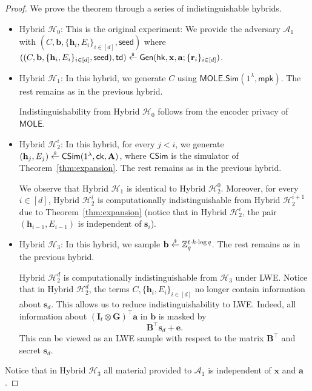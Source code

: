 \documentclass{article}
\newcommand{\td}{\mathsf{td}}
\newcommand{\MOLE}{\mathsf{MOLE}}
\newcommand{\getsr}{\overset{\raisebox{-1pt}{$\scriptscriptstyle \$$}}{\gets}}
\newcommand{\sample}{\getsr}
\newcommand{\Z}{\mathbb{Z}}
\renewcommand{\sec}{\ensuremath{\lambda}}
\newcommand{\Sim}{\mathsf{Sim}}
\newcommand{\Adv}{\mathcal{A}}
\newcommand{\ck}{\mathsf{ck}}
\newcommand{\algofont}[1]{\ensuremath{\mathsf{#1}}}
\newcommand{\Gen}{{\algofont{Gen}}}
\newcommand{\id}{\ensuremath{\mathbf{I}}}
\newcommand{\mpk}{\mathsf{mpk}}
\newcommand{\hk}{\ensuremath{\mathsf{hk}}}
\newcommand{\thmref}[1]{Theorem~\ref{thm:#1}}
\newcommand\bbbone{1}
\begin{document}
\begin{proof}

We prove the theorem through a series of indistinguishable hybrids.
\begin{itemize}
\item Hybrid ${\mathcal{H}_0}$: This is the original experiment: We provide the adversary $\Adv_1$ with $(C, \mathbf{b}, \{\mathbf{h}_i, E_i\}_{i\in[d]}, \mathsf{seed})$ where $((C, \mathbf{b}, \{\mathbf{h}_i, E_i\}_{i\in[d]}, \mathsf{seed}), \td)\sample\Gen(\hk, \mathbf{x}, \mathbf{a}; \{\mathbf{r}_i\}_{i\in[d]})$.

\item Hybrid ${\mathcal{H}_1}$: In this hybrid, we generate $C$ using $\MOLE.\Sim(\bbbone^\sec, \mpk)$. The rest remains as in the previous hybrid.

Indistinguishability from Hybrid ${\mathcal{H}_0}$ follows from the encoder privacy of $\MOLE$.


\item Hybrid ${\mathcal{H}_{2}^i}$: In this hybrid, for every $j<i$, we generate $(\mathbf{h}_j, E_j)\sample\mathsf{C}\Sim(\bbbone^\sec, \ck, \mathbf{A})$, where $\mathsf{C}\Sim$ is the simulator of \thmref{expansion}. The rest remains as in the previous hybrid.

We observe that Hybrid ${\mathcal{H}_1}$ is identical to Hybrid ${\mathcal{H}_2^0}$. Moreover, for every $i\in[d]$, Hybrid ${\mathcal{H}_2^i}$ is computationally indistinguishable from Hybrid ${\mathcal{H}_2^{i+1}}$ due to \thmref{expansion} (notice that in Hybrid ${\mathcal{H}_2^i}$, the pair $(\mathbf{h}_{i-1}, E_{i-1})$ is independent of $\mathbf{s}_i$).

\item Hybrid ${\mathcal{H}_3}$: In this hybrid, we sample $\mathbf{b}\sample\Z_q^{t\cdot k\cdot \log q}$. The rest remains as in the previous hybrid.

Hybrid ${\mathcal{H}_2^{d}}$ is computationally indistinguishable from ${\mathcal{H}_3}$ under LWE. Notice that in Hybrid ${\mathcal{H}_2^{d}}$, the terms $C, \{\mathbf{h}_i, E_i\}_{i\in[d]}$ no longer contain information about $\mathbf{s}_d$. This allows us to reduce indistinguishability to LWE. Indeed, all information about $(\id_t\otimes \mathbf{G})^\intercal\mathbf{a}$ in $\mathbf{b}$ is masked by
\[ \mathbf{B}^\intercal \mathbf{s}_d+\mathbf e. \]
This can be viewed as an LWE sample with respect to the matrix ${\mathbf{B}}^\intercal$ and secret $\mathbf{s}_d$.
\end{itemize}
Notice that in Hybrid ${\mathcal{H}_3}$ all material provided to $\Adv_1$ is independent of $\mathbf{x}$ and $\mathbf{a}$.
\end{proof}
\end{document}
